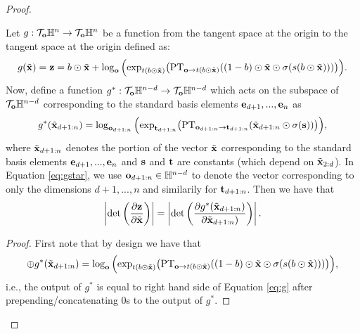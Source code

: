 \begin{proof}
\begin{lemma}
Let $g : \mathcal{T}_{\mathbf{o}}\mathbb{H}^n \rightarrow \mathcal{T}_{\mathbf{o}}\mathbb{H}^n$ be a function from the tangent space at the origin to the tangent space at the origin defined as:
\begin{equation}\label{eq:g}
g(\tilde{\mathbf{x}}) = \mathbf{z} = b \odot \tilde{
    \mathbf{x}} + \log_{\textbf{o}}\Big( \textnormal{exp}_{t(b \odot \tilde{\mathbf{x}})}\big(\textnormal{PT}_{\textbf{o}\to t(b \odot \tilde{\mathbf{x}}) }((1-b) \odot \tilde{\mathbf{x}} \odot \sigma(s(b \odot \tilde{\mathbf{x}})))\big)\Big).
\end{equation}
Now, define a function $g^* : \mathcal{T}_{\mathbf{o}}\mathbb{H}^{n-d} \rightarrow \mathcal{T}_{\mathbf{o}}\mathbb{H}^{n-d}$ which acts on the subspace of $\mathcal{T}_{\mathbf{o}}\mathbb{H}^{n-d}$ corresponding to the standard basis elements $\mathbf{e}_{d+1}, ..., \mathbf{e}_n$ as
\begin{equation}\label{eq:gstar}
g^*(\tilde{\mathbf{x}}_{d+1:n}) =   \log_{\mathbf{o}_{d+1:n}}\Big( \textnormal{exp}_{\mathbf{t}_{d+1:n}}\big(\textnormal{PT}_{\mathbf{o}_{d+1:n} \to \mathbf{t}_{d+1:n}}( \tilde{\mathbf{x}}_{d+1:n} \odot \sigma(\mathbf{s}))\big)\Big),
\end{equation}
where $\tilde{\mathbf{x}}_{d+1:n}$ denotes the portion of the vector $\tilde{\mathbf{x}}$ corresponding to the standard basis elements $\mathbf{e}_{d+1}, ..., \mathbf{e}_n$ and $\mathbf{s}$ and $\mathbf{t}$ are constants (which depend on $\tilde{\mathbf{x}}_{2:d}$).
In Equation \eqref{eq:gstar}, we use $\mathbf{o}_{d+1:n} \in \mathbb{H}^{n-d}$ to denote the vector corresponding to only the dimensions $d+1, ..., n$ and similarily for $\mathbf{t}_{d+1:n}$.
Then we have that
\begin{equation}
    \left|\textnormal{det}\left(\frac{\partial \mathbf{z}}{\partial \tilde{\mathbf{x}}}\right)\right| =    \left|\textnormal{det}\left(\frac{\partial g^*(\tilde{\mathbf{x}}_{d+1:n})}{\partial \tilde{\mathbf{x}}_{d+1:n})}\right)\right|.
\end{equation}
\end{lemma}
\begin{proof}
First note that by design we have that 
\begin{equation}
    [0,0..,0] \oplus g^*(\tildex_{d+1:n}) = \log_{\textbf{o}}\Big( \textnormal{exp}_{t(b \odot \tilde{\mb{x}})}\big(\textnormal{PT}_{\textbf{o}\to t(b \odot \tilde{\mb{x}}) }((1-b) \odot \tilde{\mb{x}} \odot \sigma(s(b \odot \tildex)))\big)\Big),
\end{equation}
i.e., the output of $g^*$ is equal to right hand side of Equation \eqref{eq:g} after prepending/concatenating 0s to the output of $g^*$. 


\end{proof}
\end{proof}

